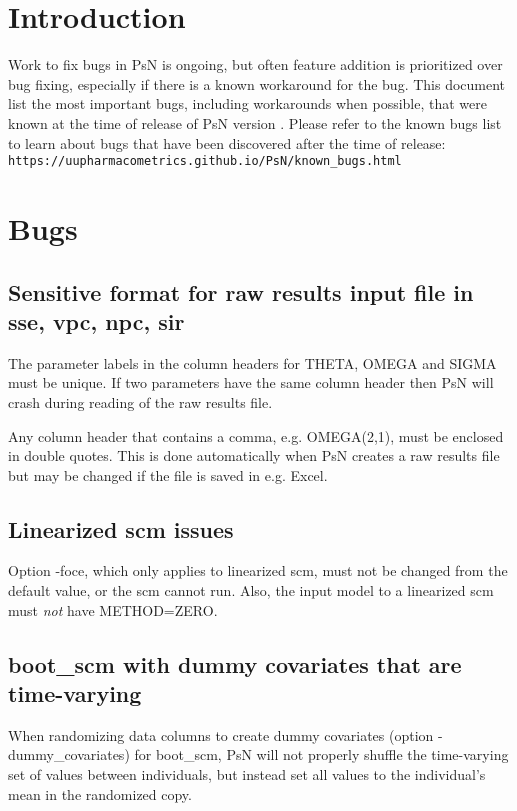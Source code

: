 
\usepackage{hyperref}



\maketitle
\tableofcontents
\newpage

\section{Introduction}
Work to fix bugs in PsN is ongoing, but often feature addition is prioritized over bug fixing, especially if there is a known workaround for the bug. This document list the most important bugs, including workarounds when possible, that were known at the time of release of PsN version \psnversion. Please refer to the known bugs list to learn about bugs that have been discovered after the time of release:\\
\texttt{https://uupharmacometrics.github.io/PsN/known\_bugs.html}   

\section{Bugs}
\subsection{Sensitive format for raw results input file in sse, vpc, npc, sir}
The parameter labels in the column headers for THETA, OMEGA and SIGMA must be unique. If two parameters have the same
column header then PsN will crash during reading of the raw results file.

Any column header that contains a comma, e.g. OMEGA(2,1), must be enclosed in double quotes. This is done automatically when PsN creates a raw results file but may be changed if the file is saved in e.g. Excel.

\subsection{Linearized scm issues}
Option -foce, which only applies to linearized scm, must not be changed from the default value, or the scm cannot run. Also, the input model to a linearized scm must \emph{not} have METHOD=ZERO.

\subsection{boot\_scm with dummy covariates that are time-varying}
When randomizing data columns to create dummy covariates (option -dummy\_covariates) for boot\_scm, PsN will not properly
shuffle the time-varying set of values between individuals, but instead set all values to the individual's mean in the randomized copy.

